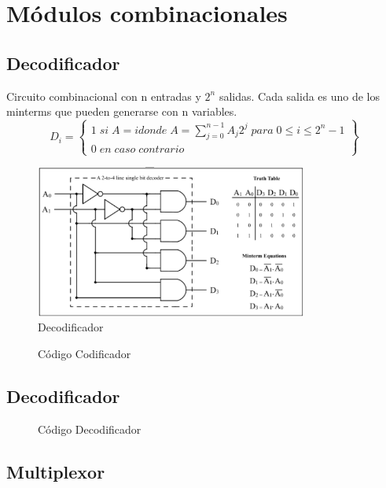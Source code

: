 \section{Módulos combinacionales}

\subsection{Decodificador}
Circuito combinacional con n entradas y $2^{n}$ salidas. Cada salida es uno de los minterms que pueden generarse con n variables.
\[
	D_{i} =\left\{ \begin{array}{l}
		1\; si\; A=i donde\; A= \sum^{n-1}_{j=0}A_{j}2^{j}\; para\; 0 \leq i \leq 2^{n} -1 \\
		0 \; en \; caso \; contrario
	\end{array}\right\}
\]

\begin{figure}[H]
	\centering
	\includegraphics[width=0.8\textwidth]{images/Tema_3/Decodificador.PNG}
	\caption{Decodificador}
\end{figure}
\begin{figure}[H]
	\centering
	
	\caption{Código Codificador}
\end{figure}

\subsection{Decodificador}
\begin{figure}[H]
	\centering
	
	\caption{Código Decodificador}
\end{figure}

\subsection{Multiplexor}

